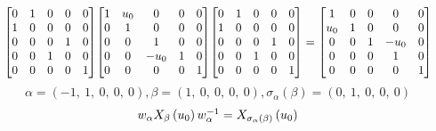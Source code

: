 \documentclass[11pt]{article}
\theoremstyle{definition}
\begin{document}
\[
\scaletoalign{\textwidth}{{\left[\begin{matrix}0 & 1 & 0 & 0 & 0\\1 & 0 & 0 & 0 & 0\\0 & 0 & 0 & 1 & 0\\0 & 0 & 1 & 0 & 0\\0 & 0 & 0 & 0 & 1\end{matrix}\right]} {\left[\begin{matrix}1 & u_{0} & 0 & 0 & 0\\0 & 1 & 0 & 0 & 0\\0 & 0 & 1 & 0 & 0\\0 & 0 & - u_{0} & 1 & 0\\0 & 0 & 0 & 0 & 1\end{matrix}\right]} {\left[\begin{matrix}0 & 1 & 0 & 0 & 0\\1 & 0 & 0 & 0 & 0\\0 & 0 & 0 & 1 & 0\\0 & 0 & 1 & 0 & 0\\0 & 0 & 0 & 0 & 1\end{matrix}\right]} = {\left[\begin{matrix}1 & 0 & 0 & 0 & 0\\u_{0} & 1 & 0 & 0 & 0\\0 & 0 & 1 & - u_{0} & 0\\0 & 0 & 0 & 1 & 0\\0 & 0 & 0 & 0 & 1\end{matrix}\right]}}
\]
\[
\alpha = \left( -1, \  1, \  0, \  0, \  0\right), \beta = \left( 1, \  0, \  0, \  0, \  0\right), \sigma_{\alpha}(\beta) = \left( 0, \  1, \  0, \  0, \  0\right)
\]
\[
\scaletoalign{\textwidth}{w_{\alpha} X_{\beta}\left(u_{0}\right) w_{\alpha}^{-1} = X_{\sigma_{\alpha}\left(\beta\right)}\left(u_{0}\right)}
\]
\end{document}
